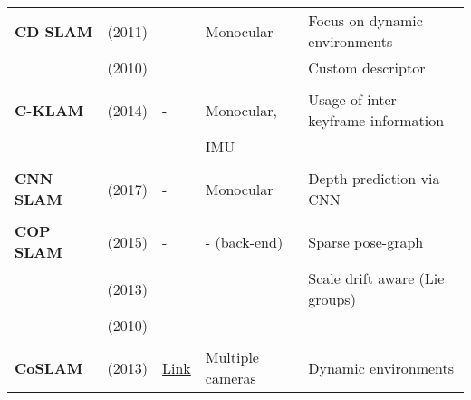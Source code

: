 \documentclass[a4paper,12pt]{scrartcl}
\begin{document}
{\begin{longtable}{l|l|l|l|l}
    \textbf{CD SLAM}       & \cite{Pirker2011} (2011)          & -                                                                  & Monocular             & Focus on dynamic environments\\
                           & \cite{Pirker2010} (2010)          &                                                                    &                       & Custom descriptor\\
                           &                                   &                                                                    &                       &\\
    \textbf{C-KLAM}        & \cite{Nerurkar2014} (2014)        & -                                                                  & Monocular,            & Usage of inter-keyframe information\\
                           &                                   &                                                                    & IMU                   &\\
                           &                                   &                                                                    &                       &\\
    \textbf{CNN SLAM}      & \cite{Tateno2017} (2017)          & -                                                                  & Monocular             & Depth prediction via CNN\\
                           &                                   &                                                                    &                       &\\
    \textbf{COP SLAM}      & \cite{Dubbelman2015} (2015)       & -                                                                  & - (back-end)          & Sparse pose-graph\\
                           & \cite{Dubbelman2013} (2013)       &                                                                    &                       & Scale drift aware (Lie groups)\\
                           & \cite{Dubbelman2010} (2010)       &                                                                    &                       &\\
                           &                                   &                                                                    &                       &\\
    \textbf{CoSLAM}        & \cite{Zou2013} (2013)             & {\href{https://github.com/danping/CoSLAM}{Link}}                   & Multiple cameras      & Dynamic environments\\

\end{longtable}}
\end{document}
